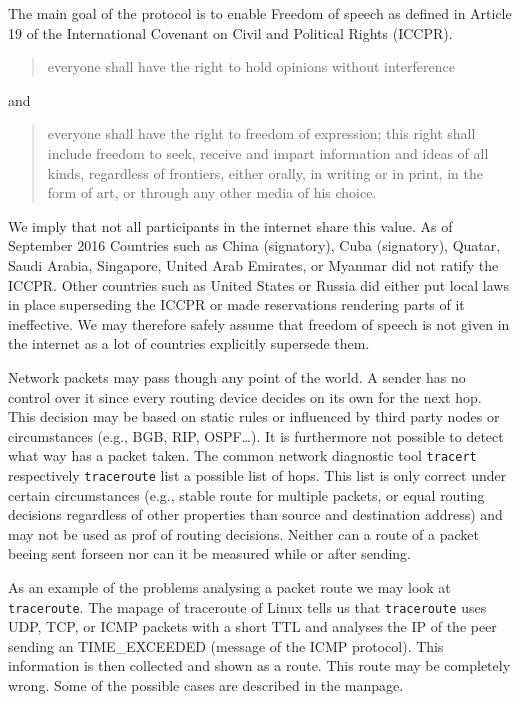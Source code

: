 The main goal of the protocol is to enable Freedom of speech as defined in Article 19 of the International Covenant on Civil and Political Rights (ICCPR)\cite{iccpr}.
\begin{quote}
	everyone shall have the right to hold opinions without interference 
\end{quote}
and
\begin{quote}
	everyone shall have the right to freedom of expression; this right shall include freedom to seek, receive and impart information and ideas of all kinds, regardless of frontiers, either orally, in writing or in print, in the form of art, or through any other media of his choice.
\end{quote}

We imply that not all participants in the internet share this value. As of September  2016 Countries such as China (signatory), Cuba (signatory), Quatar, Saudi Arabia, Singapore, United Arab Emirates, or Myanmar did not ratify the ICCPR. Other countries such as United States or Russia did either put local laws in place superseding the ICCPR or made reservations rendering parts of it ineffective. We may therefore safely assume that freedom of speech is not given in the internet as a lot of countries explicitly supersede them.

Network packets may pass though any point of the world. A sender has no control over it since every routing device decides on its own for the next hop. This decision may be based on static rules or influenced by third party nodes or circumstances (e.g., BGB, RIP, OSPF\ldots). It is furthermore not possible to detect what way has a packet taken. The common network diagnostic tool \verb|tracert| respectively \verb|traceroute| list a possible list of hops. This list is only correct under certain circumstances (e.g., stable route for multiple packets, or equal routing decisions regardless of other properties than source and destination address) and may not be used as prof of routing decisions. Neither can a route of a packet beeing sent forseen nor can it be measured while or after sending. 

As an example of the problems analysing a packet route we may look at \verb|traceroute|. The mapage of traceroute of Linux tells us that \verb|traceroute| uses UDP, TCP, or ICMP packets with a short TTL and analyses the IP of the peer sending an TIME\_EXCEEDED (message of the ICMP protocol). This information is then collected and shown as a route. This route may be completely wrong. Some of the possible cases are described in the manpage.

